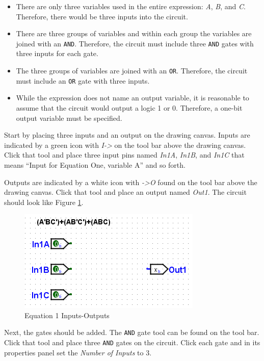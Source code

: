 \begin{itemize}
	\item There are only three variables used in the entire expression: \textit{A}, \textit{B}, and \textit{C}. Therefore, there would be three inputs into the circuit.
	\item There are three groups of variables and within each group the variables are joined with an \texttt{AND}. Therefore, the circuit must include three \texttt{AND} gates with three inputs for each gate.
	\item The three groups of variables are joined with an \texttt{OR}. Therefore, the circuit must include an \texttt{OR} gate with three inputs.
	\item While the expression does not name an output variable, it is reasonable to assume that the circuit would output a logic 1 or 0. Therefore, a one-bit output variable must be specified.
\end{itemize}

Start by placing three inputs and an output on the drawing canvas. Inputs are indicated by a green icon with \textit{I->} on the tool bar above the drawing canvas. Click that tool and place three input pins named \textit{In1A}, \textit{In1B}, and \textit{In1C} \textemdash that means ``Input for Equation One, variable A'' and so forth. 

Outputs are indicated by a white icon with \textit{->O} found on the tool bar above the drawing canvas. Click that tool and place an output named \textit{Out1}. The circuit should look like Figure \ref{fig:02-01}.

\begin{figure}[H]
	\centering
	\includegraphics[width=\maxwidth{.95\linewidth}]{gfx/02-01}
	\caption{Equation 1 Inputs-Outputs}
	\label{fig:02-01}
\end{figure}

Next, the gates should be added. The \texttt{AND} gate tool can be found on the tool bar. Click that tool and place three \texttt{AND} gates on the circuit. Click each gate and in its properties panel set the \textit{Number of Inputs} to 3. 

